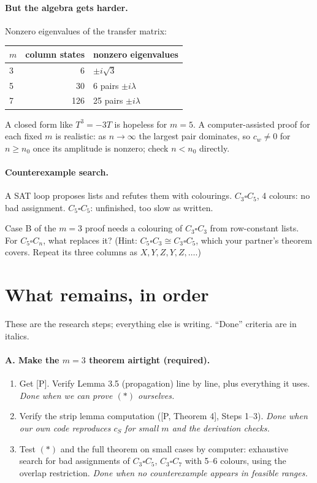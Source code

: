 \documentclass[11pt]{article}
\theoremstyle{plain}
\theoremstyle{definition}
\newcommand{\T}{\square}
\begin{document}
\paragraph{But the algebra gets harder.} Nonzero eigenvalues of the transfer matrix:
\begin{center}
\begin{tabular}{@{}lrl@{}}
\toprule
$m$ & column states & nonzero eigenvalues\\
\midrule
3 & 6 & $\pm i\sqrt3$\\
5 & 30 & 6 pairs $\pm i\lambda$\\
7 & 126 & 25 pairs $\pm i\lambda$\\
\bottomrule
\end{tabular}
\end{center}
A closed form like $T^3=-3T$ is hopeless for $m=5$. A computer-assisted proof for each fixed
$m$ is realistic: as $n\to\infty$ the largest pair dominates, so $c_w\ne0$ for $n\ge n_0$ once
its amplitude is nonzero; check $n<n_0$ directly.

\paragraph{Counterexample search.} A SAT loop proposes lists and refutes them with
colourings. $C_3\T C_5$, 4 colours: no bad assignment. $C_5\T C_5$: unfinished, too slow as
written.

\begin{ponder}
Case B of the $m=3$ proof needs a colouring of $C_3\T C_3$ from row-constant lists. For
$C_5\T C_n$, what replaces it? (Hint: $C_5\T C_3\cong C_3\T C_5$, which your partner's theorem
covers. Repeat its three columns as $X,Y,Z,Y,Z,\ldots$.)
\end{ponder}

\section{What remains, in order}

These are the research steps; everything else is writing. ``Done'' criteria are in italics.

\paragraph{A. Make the $m=3$ theorem airtight (required).}
\begin{enumerate}[nosep]
\item Get [P]. Verify Lemma 3.5 (propagation) line by line, plus everything it uses.
\emph{Done when we can prove $(\ast)$ ourselves.}
\item Verify the strip lemma computation ([P, Theorem 4], Steps 1--3).
\emph{Done when our own code reproduces $c_S$ for small $m$ and the derivation checks.}
\item Test $(\ast)$ and the full theorem on small cases by computer: exhaustive search for
bad assignments of $C_3\T C_5$, $C_3\T C_7$ with 5--6 colours, using the overlap restriction.
\emph{Done when no counterexample appears in feasible ranges.}
\end{enumerate}
\end{document}
